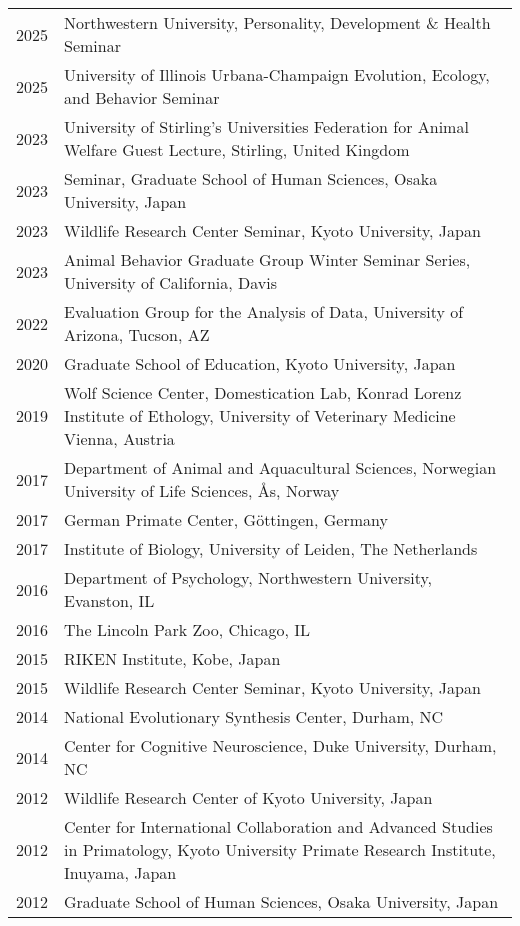 \documentclass[11pt]{article}
\begin{document}
\begin{longtable}{p{3cm}p{12cm}}
2025 & Northwestern University, Personality, Development \& Health Seminar \\
2025 & University of Illinois Urbana-Champaign Evolution, Ecology, and
Behavior Seminar \\
2023 & University of Stirling's Universities Federation for Animal
Welfare Guest Lecture, Stirling, United Kingdom \\
2023 & Seminar, Graduate School of Human Sciences, Osaka University, Japan \\
2023 & Wildlife Research Center Seminar, Kyoto University, Japan \\
2023 & Animal Behavior Graduate Group Winter Seminar Series, University of California, Davis \\
2022 & Evaluation Group for the Analysis of Data, University of Arizona, Tucson, AZ \\
2020 & Graduate School of Education, Kyoto University, Japan \\
2019 & Wolf Science Center, Domestication Lab, Konrad Lorenz Institute
of Ethology, University of Veterinary Medicine Vienna, Austria \\
2017 & Department of Animal and Aquacultural Sciences, Norwegian University of Life Sciences, {\AA}s, Norway \\
2017 & German Primate Center, G\"{o}ttingen, Germany \\
2017 & Institute of Biology, University of Leiden, The Netherlands \\
2016 & Department of Psychology, Northwestern University, Evanston, IL \\
2016 & The Lincoln Park Zoo, Chicago, IL \\
2015 & RIKEN Institute, Kobe, Japan \\
2015 & Wildlife Research Center Seminar, Kyoto University, Japan \\
2014 & National Evolutionary Synthesis Center, Durham, NC \\
2014 & Center for Cognitive Neuroscience, Duke University, Durham, NC \\
2012 & Wildlife Research Center of Kyoto University, Japan \\
2012 & Center for International Collaboration and Advanced Studies in
Primatology, Kyoto University Primate Research Institute, Inuyama, Japan \\
2012 & Graduate School of Human Sciences, Osaka University, Japan \\

\end{longtable}
\end{document}

